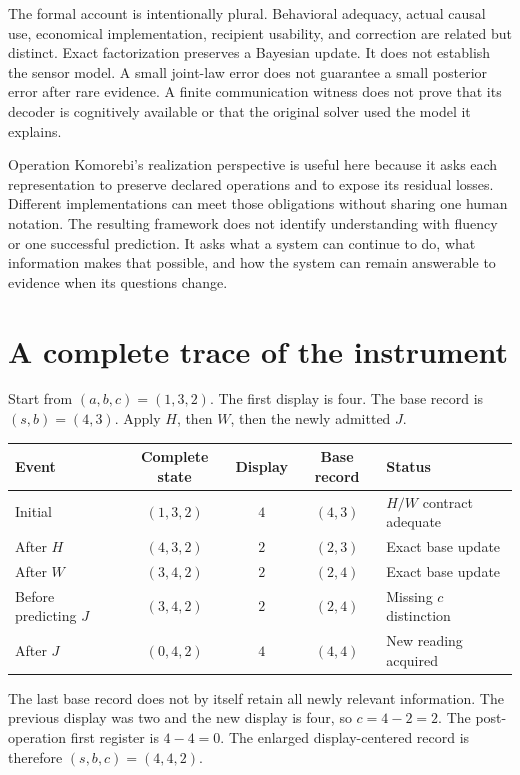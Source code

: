 \documentclass[11pt,letterpaper]{article}
\theoremstyle{plain}
\theoremstyle{definition}
\begin{document}
The formal account is intentionally plural. Behavioral adequacy, actual causal use, economical implementation, recipient usability, and correction are related but distinct. Exact factorization preserves a Bayesian update. It does not establish the sensor model. A small joint-law error does not guarantee a small posterior error after rare evidence. A finite communication witness does not prove that its decoder is cognitively available or that the original solver used the model it explains.

Operation Komorebi's realization perspective is useful here because it asks each representation to preserve declared operations and to expose its residual losses. Different implementations can meet those obligations without sharing one human notation. The resulting framework does not identify understanding with fluency or one successful prediction. It asks what a system can continue to do, what information makes that possible, and how the system can remain answerable to evidence when its questions change.

\clearpage\appendix
\section{A complete trace of the instrument}\label{app:trace}
Start from $(a,b,c)=(1,3,2)$. The first display is four. The base record is $(s,b)=(4,3)$. Apply $H$, then $W$, then the newly admitted $J$.

\begin{center}
\begin{tabular}{@{}lcccl@{}}\toprule
Event & Complete state & Display & Base record & Status\\\midrule
Initial & $(1,3,2)$ & $4$ & $(4,3)$ & $H/W$ contract adequate\\
After $H$ & $(4,3,2)$ & $2$ & $(2,3)$ & Exact base update\\
After $W$ & $(3,4,2)$ & $2$ & $(2,4)$ & Exact base update\\
Before predicting $J$ & $(3,4,2)$ & $2$ & $(2,4)$ & Missing $c$ distinction\\
After $J$ & $(0,4,2)$ & $4$ & $(4,4)$ & New reading acquired\\\bottomrule
\end{tabular}
\end{center}

The last base record does not by itself retain all newly relevant information. The previous display was two and the new display is four, so $c=4-2=2$. The post-operation first register is $4-4=0$. The enlarged display-centered record is therefore $(s,b,c)=(4,4,2)$.
\end{document}
